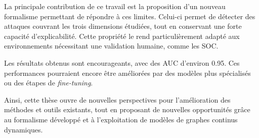 \documentclass[a4paper,11pt,twoside]{StyleThese}
\begin{document}
La principale contribution de ce travail est la proposition d'un nouveau formalisme permettant de répondre à ces limites. Celui-ci permet de détecter des attaques couvrant les trois dimensions étudiées, tout en conservant une forte capacité d'explicabilité. Cette propriété le rend particulièrement adapté aux environnements nécessitant une validation humaine, comme les SOC.

Les résultats obtenus sont encourageants, avec des AUC d'environ 0.95. Ces performances pourraient encore être améliorées par des modèles plus spécialisés ou des étapes de \textit{fine-tuning}.


Ainsi, cette thèse ouvre de nouvelles perspectives pour l'amélioration des méthodes et outils existants, tout en proposant de nouvelles opportunités grâce au formalisme développé et à l'exploitation de modèles de graphes continus dynamiques.

\ifdefined{}
\else


\end{document}
